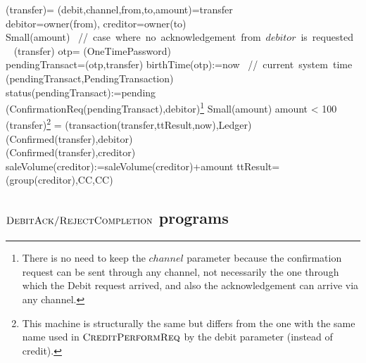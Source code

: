 \begin{asm}
(transfer)=\+
\LET (debit,channel,from,to,amount)=transfer \\
\LET debitor=owner(from), creditor=owner(to)\\
\IF Small(amount) 
\mbox{  // case where no acknowledgement from $debitor$ is requested}\+
   \THEN ~ (transfer) \-
   \ELSE \+
       \LET otp= \NEW(OneTimePassword)\\
       \LET pendingTransact=(otp,transfer)\+
          birthTime(otp):=now \mbox{ // current system time}\\
          (pendingTransact,PendingTransaction)\\ 
          status(pendingTransact):=pending \\
          (ConfirmationReq(pendingTransact),\TO debitor)\footnote{There is no need to keep the $channel$ parameter because the confirmation request can be sent through any channel, not necessarily the one through which the Debit request arrived, and also the acknowledgement can arrive via any channel.}
       \dec\dec\-
\WHERE \+
Small(amount) \IFF amount < 100 \\
 (transfer)\footnote{This machine is structurally the same but differs from the one with the same name used in $\hbox{\sc CreditPerformReq}$ by the debit parameter (instead of credit).} =\+     
   (transaction(transfer,ttResult,now),Ledger)\\
   (Confirmed(transfer),\TO debitor)\\
   (Confirmed(transfer),\TO creditor)\\
   saleVolume(creditor):=saleVolume(creditor)+amount \-
ttResult=(group(creditor),CC,CC)
\end{asm}


\subsection{ $\hbox{\sc DebitAck/RejectCompletion}$ programs}
\label{sect:debitackreject}

